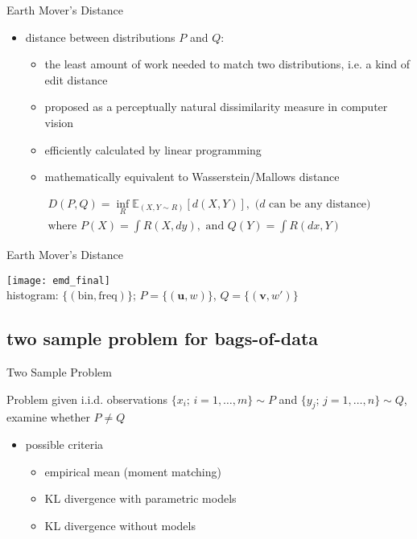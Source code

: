 \documentclass[fleqn,aspectratio=1610]{beamer}
\begin{document}
\begin{frame}[label={sec:orgf017324}]{Earth Mover's Distance}
\begin{itemize}
\item distance between distributions \(P\) and \(Q\):
\begin{itemize}
\item the least amount of work needed to match two distributions,
i.e. a kind of edit distance
\item proposed 
as a perceptually natural dissimilarity measure 
in computer vision
\item efficiently calculated by linear programming
\item mathematically equivalent to Wasserstein/Mallows distance
\end{itemize}
\end{itemize}

\begin{multline}
  D(P,Q)=\inf_{R} \mathbb{E}_{(X,Y\sim R)}[d(X,Y)],\text{ (\(d\) can be any distance)} \\
  \text{where } P(X)=\int R(X,dy),
  \text{ and } Q(Y)=\int R(dx,Y)
\end{multline}
\end{frame}

\begin{frame}[label={sec:org2742db4}]{Earth Mover's Distance}
\begin{center}
\texttt{[image: emd\_final]}
\\[10pt]
histogram: \(\{(\text{bin}, \text{freq})\}\);
\(P=\{(\boldsymbol{u},w)\}\), 
\(Q=\{(\boldsymbol{v},w')\}\)
\end{center}
\end{frame}


\subsection{two sample problem for bags-of-data}
\label{sec:orgc273c38}
\begin{frame}[label={sec:org017d3ef}]{Two Sample Problem}
\begin{alertblock}{Problem}
given i.i.d. observations 
\(\{x_{i};\,i=1,\dotsc,m\}\sim P\) and 
\(\{y_{j};\,j=1,\dotsc,n\}\sim Q\),
examine whether \(P\not=Q\)
\bigskip
\end{alertblock}
\begin{itemize}
\item possible criteria
\begin{itemize}
\item empirical mean (moment matching)
\item KL divergence with parametric models
\item KL divergence without models
\end{itemize}
\end{itemize}
\end{frame}
\end{document}
